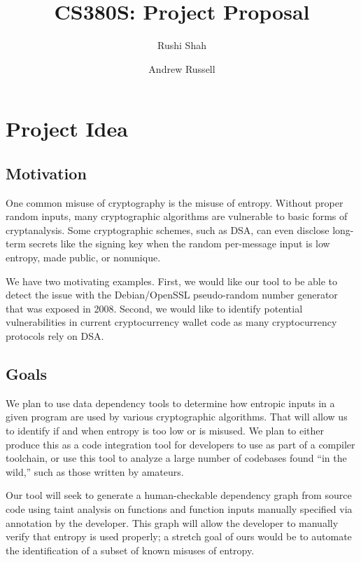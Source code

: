 \documentclass[letterpaper,twocolumn,10pt]{article}
\begin{document}
\date{}

\title{\Large \bf CS380S: Project Proposal}

\author{
{\rm Rushi Shah}
\and
{\rm Andrew Russell}
}

\maketitle

\section{Project Idea}

\subsection{Motivation}
One common misuse of cryptography is the misuse of entropy. Without proper random inputs, many cryptographic algorithms
are vulnerable to basic forms of cryptanalysis. Some cryptographic schemes, such as DSA, can even disclose long-term secrets
like the signing key when the random per-message input is low entropy, made public, or nonunique.

We have two motivating examples. First, we would like our tool to be able to detect the issue with the Debian/OpenSSL pseudo-random number generator that was exposed in 2008. 
Second, we would like to identify potential vulnerabilities in current cryptocurrency wallet code as many cryptocurrency protocols rely on DSA.

\subsection{Goals}
We plan to use data dependency tools to determine how entropic inputs in a given program are used by various cryptographic algorithms. 
That will allow us to identify if and when entropy is too low or is misused. We plan to either produce
this as a code integration tool for developers to use as part of a compiler toolchain, or use this tool to analyze a large number of codebases
found ``in the wild,'' such as those written by amateurs.

Our tool will seek to generate a human-checkable dependency graph from source code
using taint analysis on functions and function inputs manually specified via annotation by the developer.
This graph will allow the developer to manually verify that entropy is used properly; a stretch goal 
of ours would be to automate the identification of a subset of known misuses of entropy.
\end{document}
